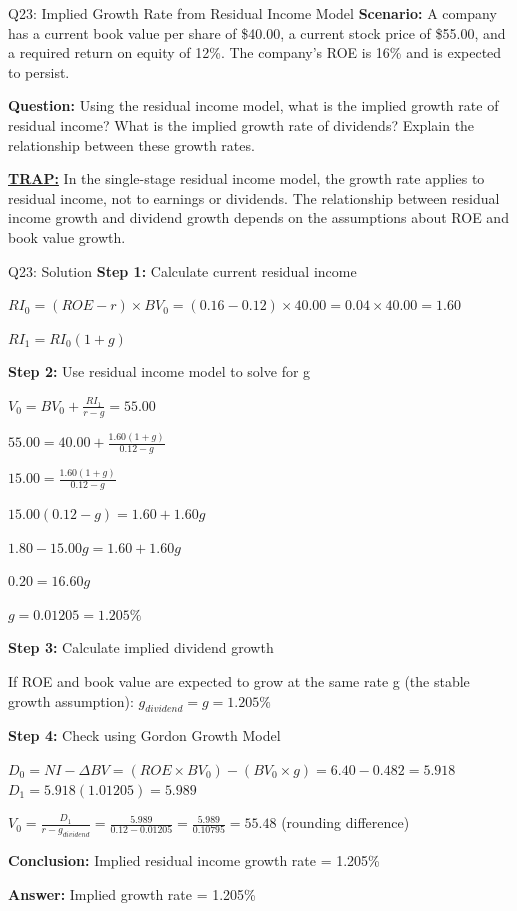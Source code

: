 \documentclass{beamer}
\renewcommand{\scriptsize}{\fontsize{6pt}{7pt}\selectfont}
\begin{document}
	\begin{frame}{Q23: Implied Growth Rate from Residual Income Model}
		\scriptsize
		\textbf{Scenario:} A company has a current book value per share of \$40.00, a current stock price of \$55.00, and a required return on equity of 12\%. The company's ROE is 16\% and is expected to persist.
		
		\textbf{Question:} Using the residual income model, what is the implied growth rate of residual income? What is the implied growth rate of dividends? Explain the relationship between these growth rates.
		
		\vspace{2pt}
		\underline{\textbf{TRAP:}} In the single-stage residual income model, the growth rate applies to residual income, not to earnings or dividends. The relationship between residual income growth and dividend growth depends on the assumptions about ROE and book value growth.
	\end{frame}
	
	\begin{frame}{Q23: Solution}
		\scriptsize
		\textbf{Step 1:} Calculate current residual income
		
		$RI_0 = (ROE - r) \times BV_0 = (0.16 - 0.12) \times 40.00 = 0.04 \times 40.00 = 1.60$
		
		$RI_1 = RI_0(1+g)$
		
		\vspace{2pt}
		\textbf{Step 2:} Use residual income model to solve for g
		
		$V_0 = BV_0 + \frac{RI_1}{r - g} = 55.00$
		
		$55.00 = 40.00 + \frac{1.60(1+g)}{0.12 - g}$
		
		$15.00 = \frac{1.60(1+g)}{0.12 - g}$
		
		$15.00(0.12 - g) = 1.60 + 1.60g$
		
		$1.80 - 15.00g = 1.60 + 1.60g$
		
		$0.20 = 16.60g$
		
		$g = 0.01205 = 1.205\%$
		
		\vspace{2pt}
		\textbf{Step 3:} Calculate implied dividend growth
		
		If ROE and book value are expected to grow at the same rate g (the stable growth assumption):
		$g_{dividend} = g = 1.205\%$
		
		\vspace{2pt}
		\textbf{Step 4:} Check using Gordon Growth Model
		
		$D_0 = NI - \Delta BV = (ROE \times BV_0) - (BV_0 \times g) = 6.40 - 0.482 = 5.918$
		$D_1 = 5.918(1.01205) = 5.989$
		
		$V_0 = \frac{D_1}{r-g_{dividend}} = \frac{5.989}{0.12 - 0.01205} = \frac{5.989}{0.10795} = 55.48$ (rounding difference)
		
		\vspace{2pt}
		\textbf{Conclusion:} Implied residual income growth rate = 1.205\%
		
		\textbf{Answer:} Implied growth rate = 1.205\%
	\end{frame}
	
\end{document}
